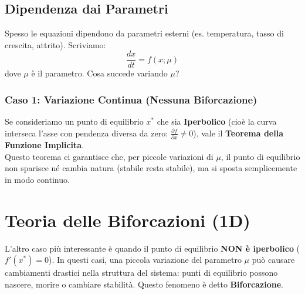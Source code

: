 \documentclass[openany]{book}
\theoremstyle{definition}
\theoremstyle{remark}
\begin{document}
\subsection{Dipendenza dai Parametri}

Spesso le equazioni dipendono da parametri esterni (es. temperatura, tasso di crescita, attrito). Scriviamo:
\begin{equation}
    \frac{dx}{dt} = f(x; \mu)
\end{equation}
dove $\mu$ è il parametro. Cosa succede variando $\mu$?

\subsubsection*{Caso 1: Variazione Continua (Nessuna Biforcazione)}
Se consideriamo un punto di equilibrio $x^*$ che sia \textbf{Iperbolico} (cioè la curva interseca l'asse con pendenza diversa da zero: $\frac{\partial f}{\partial x} \neq 0$), vale il \textbf{Teorema della Funzione Implicita}.
\\
Questo teorema ci garantisce che, per piccole variazioni di $\mu$, il punto di equilibrio non sparisce né cambia natura (stabile resta stabile), ma si sposta semplicemente in modo continuo.

\begin{center}
\end{center}


\section{Teoria delle Biforcazioni (1D)}
L'altro caso più interessante è quando il punto di equilibrio \textbf{NON è iperbolico} ($f'(x^*) = 0$). In questi casi, una piccola variazione del parametro $\mu$ può causare cambiamenti drastici nella struttura del sistema: punti di equilibrio possono nascere, morire o cambiare stabilità. Questo fenomeno è detto \textbf{Biforcazione}.
\end{document}

